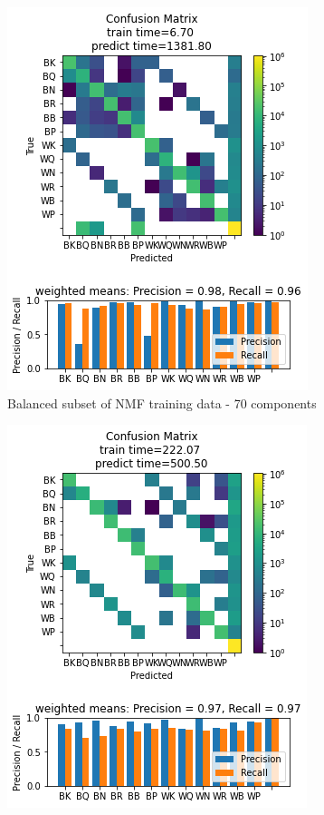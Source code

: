 \documentclass{article}
\newcommand{\NMFBL}{Balanced subset of NMF training data - 70 components}
\begin{document}
\begin{figure}[h]
\begin{subfigure}{0.33\textwidth}
\includegraphics[width=0.9\linewidth]{LDA_B_NMF70c_160x160_evaluation.png} 
\caption{\NMFBL}
\end{subfigure}
\begin{subfigure}{0.33\textwidth}
\includegraphics[width=0.9\linewidth]{LDA_PCA50c_160x160_evaluation.png}

\end{subfigure}
\end{figure}
\end{document}
